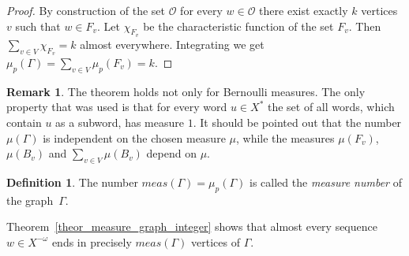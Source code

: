 \documentclass[12pt]{article}
\newcommand{\xmo}{X^{-\omega}}
\newcommand{\mgr}{meas}
\newcommand{\gr}{\Gamma}
\newtheorem{cor}[theor]{Corollary}
\theoremstyle{definition}
\newtheorem{defi}{Definition}
\newtheorem{remark}{Remark}
\begin{document}
\begin{proof}
By construction of the set $\mathcal{O}$ for every $w\in\mathcal{O}$ there exist exactly $k$
vertices $v$ such that $w\in F_v$. Let $\chi_{F_v}$ be the characteristic function of the set
$F_v$. Then $\sum_{v\in V}\chi_{F_v}=k$ almost everywhere. Integrating we get
$\mu_p(\gr)=\sum\limits_{v\in V} \mu_p(F_v)=k$.
\end{proof}



%


\begin{remark} The theorem holds not only for Bernoulli measures. The only property that was used is that
for every word $u\in X^{*}$ the set of all words, which contain $u$ as a subword, has measure $1$.
It should be pointed out that the number $\mu(\gr)$ is independent on the chosen measure $\mu$,
while the measures $\mu(F_v)$, $\mu(B_v)$ and $\sum_{v\in V} \mu(B_v)$ depend on $\mu$.
\end{remark}

\begin{defi}
The number $\mgr(\gr)=\mu_p(\gr)$ is called the \textit{measure number} of the graph~$\gr$.
\end{defi}

Theorem~\ref{theor_measure_graph_integer} shows that almost every sequence $w\in\xmo$ ends in
precisely $\mgr(\gr)$ vertices of $\gr$.
\end{document}
